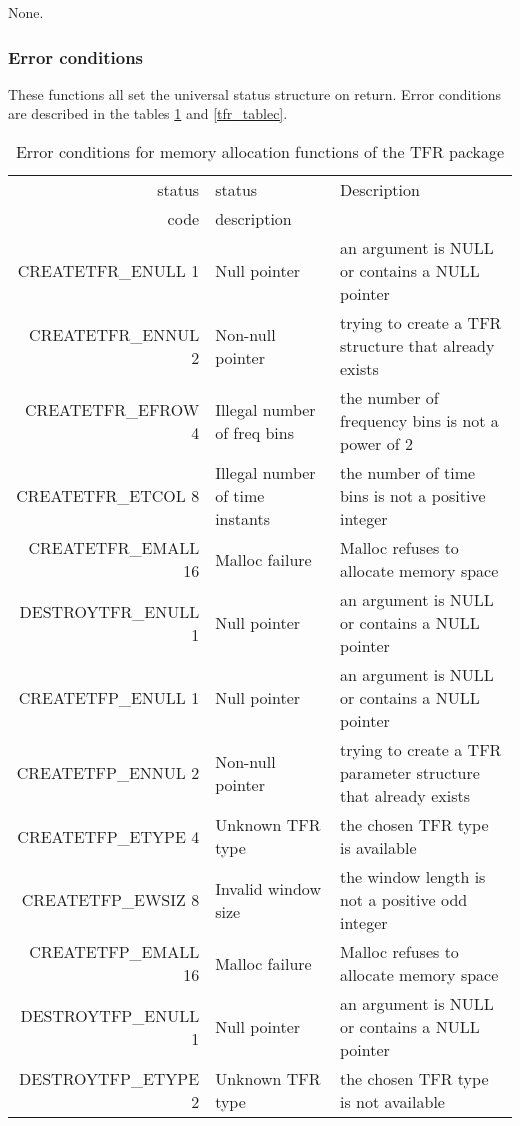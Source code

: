 \documentclass{article}
\begin{document}
None.

\subsubsection{Error conditions}


These functions all set the universal status structure on return.
Error conditions are described in the tables \ref{tfr_tableb} and
\ref{tfr_tablec}.

\begin{table}
\begin{tabular}{|r|l|p{2in}|}
\hline
status  & status          & Description\\
code    & description     & \\
\hline
CREATETFR\_ENULL 1  & Null pointer
& an argument is NULL or contains a NULL pointer\\
CREATETFR\_ENNUL 2  & Non-null pointer
& trying to create a TFR structure that already exists\\
CREATETFR\_EFROW 4  & Illegal number of freq bins
& the number of frequency bins is not a power of 2\\
CREATETFR\_ETCOL 8  & Illegal number of time instants
& the number of time bins is not a positive integer\\
CREATETFR\_EMALL 16 & Malloc failure
& Malloc refuses to allocate memory space\\
\hline
\hline
DESTROYTFR\_ENULL 1  & Null pointer
& an argument is NULL or contains a NULL pointer\\
\hline
\hline
CREATETFP\_ENULL 1  & Null pointer
& an argument is NULL or contains a NULL pointer\\
CREATETFP\_ENNUL 2  & Non-null pointer
& trying to create a TFR parameter structure that already exists\\
CREATETFP\_ETYPE 4  & Unknown TFR type
& the chosen TFR type is available\\
CREATETFP\_EWSIZ 8 & Invalid window size
& the window length is not a positive odd integer\\
CREATETFP\_EMALL 16  & Malloc failure
& Malloc refuses to allocate memory space\\
\hline
\hline
DESTROYTFP\_ENULL 1  & Null pointer
& an argument is NULL or contains a NULL pointer\\
DESTROYTFP\_ETYPE 2  & Unknown TFR type
& the chosen TFR type is not available\\
\hline
\end{tabular}
\caption{\label{tfr_tableb}Error conditions for memory allocation
functions of the TFR package}
\end{table}
\end{document}
